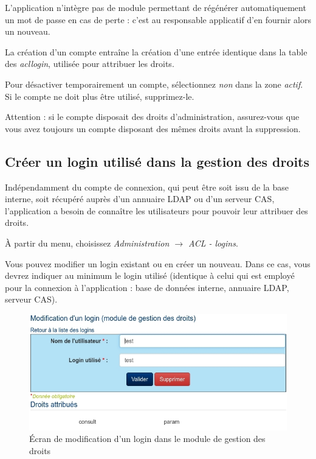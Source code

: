 L'application n'intègre pas de module permettant de régénérer automatiquement un mot de passe en cas de perte : c'est au responsable applicatif d'en fournir alors un nouveau.

La création d'un compte entraîne la création d'une entrée identique dans la table des \textit{acllogin}, utilisée pour attribuer les droits.

Pour désactiver temporairement un compte, sélectionnez \textit{non} dans la zone \textit{actif}. Si le compte ne doit plus être utilisé, supprimez-le.

Attention : si le compte disposait des droits d'administration, assurez-vous que vous avez toujours un compte disposant des mêmes droits avant la suppression.

\subsection{Créer un login utilisé dans la gestion des droits}

Indépendamment du compte de connexion, qui peut être soit issu de la base interne, soit récupéré auprès d'un annuaire LDAP ou d'un serveur CAS, l'application a besoin de connaître les utilisateurs pour pouvoir leur attribuer des droits.

À partir du menu, choisissez \textit{Administration $\rightarrow$ ACL - logins}.

Vous pouvez modifier un login existant ou en créer un nouveau. Dans ce cas, vous devrez indiquer au minimum le login utilisé (identique à celui qui est employé pour la connexion à l'application : base de données interne, annuaire LDAP, serveur CAS).

\begin{figure}[H]
\includegraphics[width=\linewidth]{dessin/acl_login}
\caption{Écran de modification d'un login dans le module de gestion des droits}
\end{figure}


